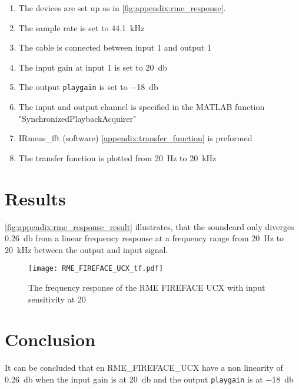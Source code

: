 \begin{enumerate}
\item The devices are set up as in \autoref{fig:appendix:rme_response}.
\item The sample rate is set to \SI{44.1}{\kilo\hertz}
\item The cable is connected between input 1 and output 1
\item The input gain at input 1 is set to \SI{20}{\decibel}
\item The output \texttt{playgain} is set to \SI{-18}{\decibel}
\item The input and output channel is specified in the MATLAB function "SynchronizedPlaybackAcquirer" 
\item IRmeas_fft (software) \autoref{appendix:transfer_function} is preformed
\item The transfer function is plotted from \SI{20}{\hertz} to \SI{20}{\kilo\hertz}
\end{enumerate}

\section*{Results}



\autoref{fig:appendix:rme_response_result} illustrates, that the soundcard only diverges \SI{0.26}{\decibel} from a linear frequency response at a frequency range from \SI{20}{\hertz} to \SI{20}{\kilo\hertz} between the output and input signal. 

\begin{figure}[H]
	\centering
	\texttt{[image: RME\_FIREFACE\_UCX\_tf.pdf]}
	\caption{The frequency response of the RME FIREFACE UCX with input sensitivity at 20}
		\label{fig:appendix:rme_response_result}
\end{figure}

\section*{Conclusion}
It can be concluded that en RME_FIREFACE_UCX have a non linearity of \SI{0.26}{\decibel} when the input gain is at \SI{20}{\decibel} and the output \texttt{playgain} is at \SI{-18}{\decibel}


